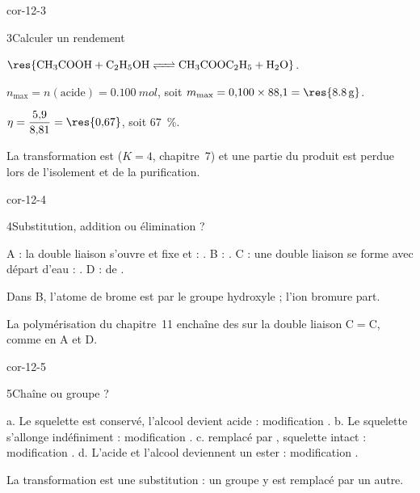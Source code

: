 \begin{blocLivre}{cor-12-3}
\begin{corrige}{3}{Calculer un rendement}
\begin{questions}
\item $\res{\ce{CH3COOH + C2H5OH <=> CH3COOC2H5 + H2O}}$.
\item $n_{\max}=n(\text{acide})=\qty{0,100}{mol}$, soit $m_{\max}=0{,}100\times88{,}1=\res{\qty{8,8}{g}}$.
\item $\eta=\dfrac{5{,}9}{8{,}81}=\res{0{,}67}$, soit 67~\%.
\item La transformation est  ($K=4$, chapitre~7) et une partie du produit est perdue lors de
l'isolement et de la purification.
\end{questions}
\end{corrige}
\end{blocLivre}
\begin{blocLivre}{cor-12-4}
\begin{corrige}{4}{Substitution, addition ou élimination ?}
\begin{questions}
\item A : la double liaison s'ouvre et fixe  et  : . B : .
C : une double liaison se forme avec départ d'eau : . D :  de .
\item Dans B, l'atome de brome est  par le groupe hydroxyle  ; l'ion bromure part.
\item La polymérisation du chapitre~11 enchaîne des  sur la double liaison C$=$C, comme en A
et D.
\end{questions}
\end{corrige}
\end{blocLivre}
\begin{blocLivre}{cor-12-5}
\begin{corrige}{5}{Chaîne ou groupe ?}
\begin{questions}
\item a. Le squelette  est conservé, l'alcool devient acide : modification .
b. Le squelette s'allonge indéfiniment : modification .
c.  remplacé par , squelette intact : modification .
d. L'acide et l'alcool deviennent un ester : modification .
\item La transformation  est une substitution : un groupe y est remplacé par un autre.
\end{questions}
\end{corrige}
\end{blocLivre}
